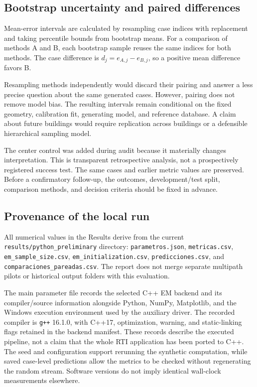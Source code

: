 \documentclass[conference,letterpaper]{IEEEtran}
\begin{document}
\subsection{Bootstrap uncertainty and paired differences}
Mean-error intervals are calculated by resampling case indices with replacement and taking percentile bounds from bootstrap means. For a comparison of methods A and B, each bootstrap sample reuses the same indices for both methods. The case difference is $d_j=e_{A,j}-e_{B,j}$, so a positive mean difference favors B.

Resampling methods independently would discard their pairing and answer a less precise question about the same generated cases. However, pairing does not remove model bias. The resulting intervals remain conditional on the fixed geometry, calibration fit, generating model, and reference database. A claim about future buildings would require replication across buildings or a defensible hierarchical sampling model.

The center control was added during audit because it materially changes interpretation. This is transparent retrospective analysis, not a prospectively registered success test. The same cases and earlier metric values are preserved. Before a confirmatory follow-up, the outcomes, development/test split, comparison methods, and decision criteria should be fixed in advance.

\subsection{Provenance of the local run}
All numerical values in the Results derive from the current \texttt{results/python\_preliminary} directory: \texttt{parametros.json}, \texttt{metricas.csv}, \texttt{em\_sample\_size.csv}, \texttt{em\_initialization.csv}, \texttt{predicciones.csv}, and \texttt{comparaciones\_pareadas.csv}. The report does not merge separate multipath pilots or historical output folders with this evaluation.

The main parameter file records the selected C++ EM backend and its compiler/source information alongside Python, NumPy, Matplotlib, and the Windows execution environment used by the auxiliary driver. The recorded compiler is \texttt{g++} 16.1.0, with C++17, optimization, warning, and static-linking flags retained in the backend manifest. These records describe the executed pipeline, not a claim that the whole RTI application has been ported to C++. The seed and configuration support rerunning the synthetic computation, while saved case-level predictions allow the metrics to be checked without regenerating the random stream. Software versions do not imply identical wall-clock measurements elsewhere.
\end{document}
